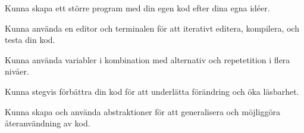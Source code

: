 
\item Kunna skapa ett större program med din egen kod efter dina egna idéer.
\item Kunna använda en editor och terminalen för att iterativt editera, kompilera, och testa din kod.
\item Kunna använda variabler i kombination med alternativ och repetetition i flera nivåer.
\item Kunna stegvis förbättra din kod för att underlätta förändring och öka läsbarhet.
\item Kunna skapa och använda abstraktioner för att generalisera och möjliggöra återanvändning av kod.
